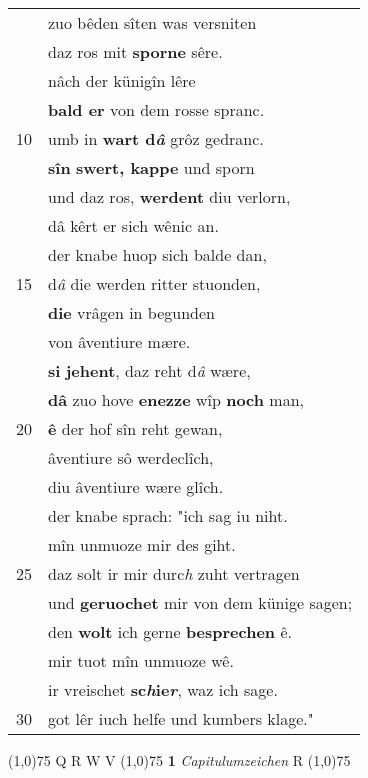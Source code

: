 \documentclass[8pt,a4paper,notitlepage]{article}
\begin{document}
\begin{table}[ht]
\begin{minipage}[t]{0.5\linewidth}
\begin{tabular}{rl}
 & zuo bêden sîten was versniten\\ 
 & daz ros mit \textbf{sporne} sêre.\\ 
 & nâch der künigîn lêre\\ 
 & \textbf{bald er} von dem rosse spranc.\\ 
10 & umb in \textbf{wart d\textit{â}} grôz gedranc.\\ 
 & \textbf{sîn} \textbf{swert, kappe} und sporn\\ 
 & und daz ros, \textbf{werdent} diu verlorn,\\ 
 & dâ kêrt er sich wênic an.\\ 
 & der knabe huop sich balde dan,\\ 
15 & d\textit{â} die werden ritter stuonden,\\ 
 & \textbf{die} vrâgen in begunden\\ 
 & von âventiure mære.\\ 
 & \textbf{si} \textbf{jehent}, daz reht d\textit{â} wære,\\ 
 & \textbf{dâ} zuo hove \textbf{en}\textbf{ezze} wîp \textbf{noch} man,\\ 
20 & \textbf{ê} der hof sîn reht gewan,\\ 
 & âventiure sô werdeclîch,\\ 
 & diu âventiure wære glîch.\\ 
 & der knabe sprach: "ich sag iu niht.\\ 
 & mîn unmuoze mir des giht.\\ 
25 & daz solt ir mir durc\textit{h} zuht vertragen\\ 
 & und \textbf{geruochet} mir von dem künige sagen;\\ 
 & den \textbf{wolt} ich gerne \textbf{besprechen} ê.\\ 
 & mir tuot mîn unmuoze wê.\\ 
 & ir vreischet \textbf{sc\textit{h}ie\textit{r}}, waz ich sage.\\ 
30 & got lêr iuch helfe und kumbers klage."\\ 
\end{tabular}
\scriptsize
\line(1,0){75} \newline
Q R W V \newline
\line(1,0){75} \newline
\textbf{1} \textit{Capitulumzeichen} R  \newline
\line(1,0){75} \newline

\end{minipage}
\end{table}
\end{document}
